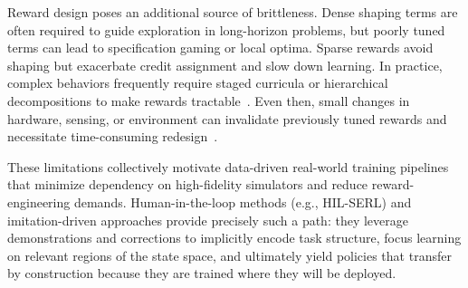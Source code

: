 Reward design poses an additional source of brittleness. Dense shaping terms are often required to guide exploration in long-horizon problems, but poorly tuned terms can lead to specification gaming or local optima. Sparse rewards avoid shaping but exacerbate credit assignment and slow down learning. In practice, complex behaviors frequently require staged curricula or hierarchical decompositions to make rewards tractable~\citep{zhangWoCoCoLearningWholeBody2024,leeLearningQuadrupedalLocomotion2020}. Even then, small changes in hardware, sensing, or environment can invalidate previously tuned rewards and necessitate time-consuming redesign~\citep{tangDeepReinforcementLearning2025a}.

These limitations collectively motivate data-driven real-world training pipelines that minimize dependency on high-fidelity simulators and reduce reward-engineering demands. Human-in-the-loop methods (e.g., HIL-SERL) and imitation-driven approaches provide precisely such a path: they leverage demonstrations and corrections to implicitly encode task structure, focus learning on relevant regions of the state space, and ultimately yield policies that transfer by construction because they are trained where they will be deployed.
